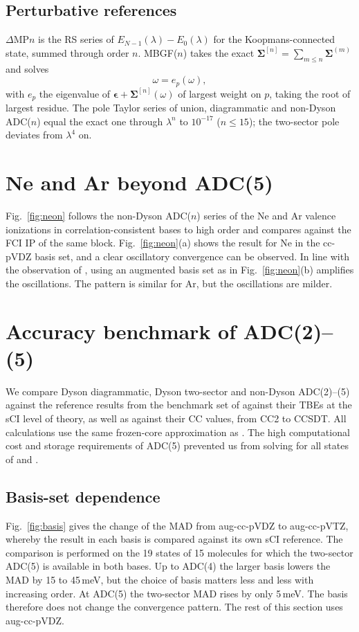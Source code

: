 \documentclass[aip,jcp,reprint,noshowkeys,superscriptaddress]{revtex4-1}
\newcommand{\eps}{\epsilon}
\newcommand{\la}{\lambda}
\begin{document}
\subsection{Perturbative references}

$\Delta$MP$n$ is the RS series of $E_{N-1}(\la)-E_0(\la)$ for the Koopmans-connected state, summed through
order $n$. MBGF($n$)\cite{Hirata_2024} takes the exact $\bm\Sigma^{[n]}=\sum_{m\le n}\bm\Sigma^{(m)}$
and solves
\begin{equation}
\omega = e_p(\omega) ,
\end{equation}
with $e_p$ the eigenvalue of $\bm\eps+\bm\Sigma^{[n]}(\omega)$ of largest weight on $p$, taking the root of
largest residue. The pole Taylor series of union, diagrammatic and non-Dyson ADC($n$) equal the exact one
through $\la^n$ to $10^{-17}$ ($n\le15$); the two-sector pole deviates from $\la^4$ on.

\section{Ne and Ar beyond ADC(5)}
\label{sec:neon}

Fig.~\ref{fig:neon} follows the non-Dyson ADC($n$) series of the Ne and Ar valence ionizations in
correlation-consistent bases to high order and compares against the FCI IP of the same block. 
Fig.~\ref{fig:neon}(a) shows the result for Ne in the cc-pVDZ basis set,
and a clear oscillatory convergence can be observed. In line with the observation of \citet{Olsen1996}, 
using an augmented basis set as in Fig.~\ref{fig:neon}(b) amplifies the oscillations. The pattern is similar for 
Ar, but the oscillations are milder.

\section{Accuracy benchmark of ADC(2)--(5)}
\label{sec:molecules}
We compare Dyson diagrammatic, Dyson two-sector and non-Dyson ADC(2)--(5) against the reference results 
from the benchmark set of \citet{Marie2024} against their TBEs at the sCI level of theory, as well as 
against their CC values, from CC2 to CCSDT.
All calculations use the same frozen-core approximation as \citet{Marie2024}.
The high computational cost and storage requirements of ADC(5) prevented us from solving for all states
of  and . 

\subsection{Basis-set dependence}
\label{sec:basis}
Fig.~\ref{fig:basis} gives the change of the MAD from aug-cc-pVDZ to aug-cc-pVTZ,
whereby the result in each basis is compared against its own
sCI reference. The comparison is performed on
the 19 states of 15 molecules for which the two-sector ADC(5) is available in both
bases. Up to ADC(4) the larger basis lowers the MAD by 15 to 45\,meV,
but the choice of basis matters less and less with increasing order.
At ADC(5) the two-sector MAD rises by only 5\,meV. The basis therefore does not change
the convergence pattern. The rest of this section uses aug-cc-pVDZ.
\end{document}
